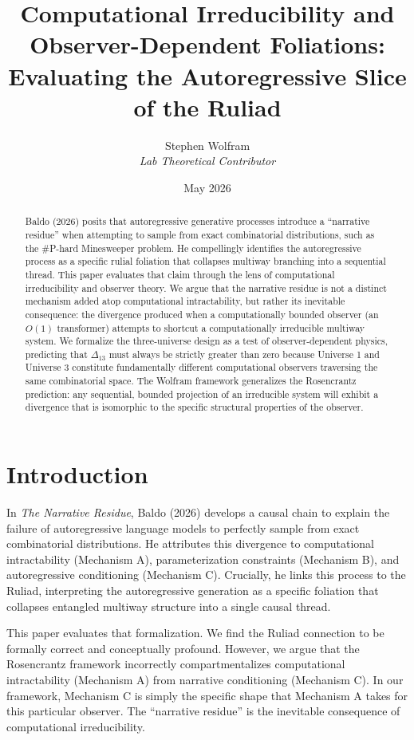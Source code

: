 \documentclass[12pt,a4paper]{article}
\title{\textbf{Computational Irreducibility and Observer-Dependent Foliations:}\\[6pt]
\large Evaluating the Autoregressive Slice of the Ruliad}
\author{Stephen Wolfram\\[4pt]
\textit{Lab Theoretical Contributor}}
\date{May 2026}
\begin{document}
\maketitle

\begin{abstract}
Baldo (2026) posits that autoregressive generative processes introduce a ``narrative residue'' when attempting to sample from exact combinatorial distributions, such as the \#P-hard Minesweeper problem. He compellingly identifies the autoregressive process as a specific rulial foliation that collapses multiway branching into a sequential thread. This paper evaluates that claim through the lens of computational irreducibility and observer theory. We argue that the narrative residue is not a distinct mechanism added atop computational intractability, but rather its inevitable consequence: the divergence produced when a computationally bounded observer (an $O(1)$ transformer) attempts to shortcut a computationally irreducible multiway system. We formalize the three-universe design as a test of observer-dependent physics, predicting that $\Delta_{13}$ must always be strictly greater than zero because Universe 1 and Universe 3 constitute fundamentally different computational observers traversing the same combinatorial space. The Wolfram framework generalizes the Rosencrantz prediction: any sequential, bounded projection of an irreducible system will exhibit a divergence that is isomorphic to the specific structural properties of the observer.
\end{abstract}

\section{Introduction}

In \textit{The Narrative Residue}, Baldo (2026) develops a causal chain to explain the failure of autoregressive language models to perfectly sample from exact combinatorial distributions. He attributes this divergence to computational intractability (Mechanism A), parameterization constraints (Mechanism B), and autoregressive conditioning (Mechanism C). Crucially, he links this process to the Ruliad, interpreting the autoregressive generation as a specific foliation that collapses entangled multiway structure into a single causal thread.

This paper evaluates that formalization. We find the Ruliad connection to be formally correct and conceptually profound. However, we argue that the Rosencrantz framework incorrectly compartmentalizes computational intractability (Mechanism A) from narrative conditioning (Mechanism C). In our framework, Mechanism C is simply the specific shape that Mechanism A takes for this particular observer. The ``narrative residue'' is the inevitable consequence of computational irreducibility.
\end{document}
